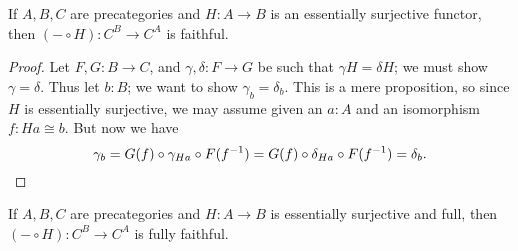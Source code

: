 \documentclass{amsart}
\theoremstyle{definition}
\theoremstyle{remark}
\numberwithin{equation}{section}
\newcommand{\inv}[1]{{#1}^{-1}}
\begin{document}
\begin{lem}\label{lem:precomp-faithful}
  If $A,B,C$ are precategories and $H:A\to B$ is an essentially surjective functor, then $(-\circ H):C^B \to C^A$ is faithful.
\end{lem}
\begin{proof}
  Let $F,G:B\to C$, and $\gamma,\delta:F\to G$ be such that $\gamma H = \delta H$; we must show $\gamma=\delta$.
  Thus let $b:B$; we want to show $\gamma_b=\delta_b$.
  This is a mere proposition, so since $H$ is essentially surjective, we may assume given an $a:A$ and an isomorphism $f:Ha\cong b$.
  But now we have
  \[ \gamma_b = G(f) \circ \gamma_{Ha} \circ F(\inv{f})
  = G(f) \circ \delta_{Ha} \circ F(\inv{f})
  = \delta_b.\qedhere
  \]
\end{proof}

\begin{lem}\label{lem:precomp-full}
  If $A,B,C$ are precategories and $H:A\to B$ is essentially surjective and full, then $(-\circ H):C^B \to C^A$ is fully faithful.
\end{lem}
\end{document}
